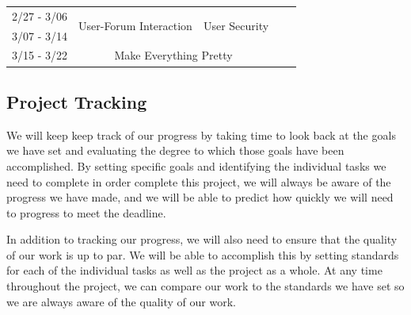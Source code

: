 \documentclass[12pt]{article}
\begin{document}
\begin{table}[!h]
\begin{tabular}{|l|c|c|c|c|}
2/27 - 3/06         & \multirow{2}{*}{User-Forum Interaction} & \multirow{2}{*}{User Security} &                                                                                                             &                                                                                                       \\ \cline{1-1}
3/07 - 3/14         &                                         &                                &                                                                                                             &                                                                                                       \\ \cline{1-3}
3/15 - 3/22         & \multicolumn{2}{c|}{Make Everything Pretty}                              &                                                                                                             &                                                                                                       \\ \hline
\end{tabular}
\end{table}
\subsection{Project Tracking}
\begin{flushleft}We will keep keep track of our progress by taking time to look back at the goals we have set and evaluating the degree to which those goals have been accomplished. By setting specific goals and identifying the individual tasks we need to complete in order complete this project, we will always be aware of the progress we have made, and we will be able to predict how quickly we will need to progress to meet the deadline.
\end{flushleft}
\begin{flushleft}
In addition to tracking our progress, we will also need to ensure that the quality of our work is up to par. We will be able to accomplish this by setting standards for each of the individual tasks as well as the project as a whole. At any time throughout the project, we can compare our work to the standards we have set so we are always aware of the quality of our work.
\end{flushleft}
\end{document}
